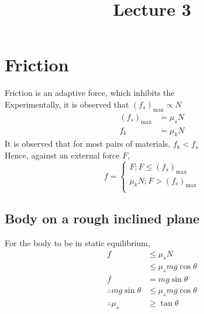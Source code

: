 \documentclass[fleqn]{article}
\title{Lecture 3}
\author{}
\date{\formatdate{4}{11}{2014}}
\begin{document}
	
\maketitle

\tableofcontents

\newpage
\section{Friction}

Friction is an adaptive force, which inhibits the\\
Experimentally, it is observed that $(f_{s})_{\text{max}} \propto N$
\begin{align*}
	(f_{s})_{\text{max}} &\dot{=} \mu_s N\\
	f_{k} &\dot{=} \mu_k N
\end{align*}
It is observed that for most pairs of materials, $f_k < f_s$\\
Hence, against an external force $F$, 
\begin{equation*}
	f = 
	\begin{cases}
		F ; F \leq (f_{s})_{\text{max}} \\
		\mu_{k} N ; F > (f_{s})_{\text{max}} \\
	\end{cases}
\end{equation*}


\subsection{Body on a rough inclined plane}

%	
%	

For the body to be in static equilibrium, 
\begin{align*}
	f &\leq  \mu_s N \\
	&\leq \mu_s m g \cos \theta \\
	f &= m g \sin \theta \\
	\therefore m g \sin \theta &\leq \mu_s m g \cos \theta\\
	\therefore \mu_s &\geq \tan \theta 
\end{align*}
\end{document}

